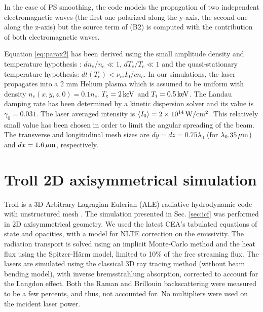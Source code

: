 \documentclass[%
 reprint,
 amsmath,amssymb,
 aps,
]{revtex4-1}
\begin{document}
In the case of PS smoothing, the code models the propagation of two independent electromagnetic waves (the first one polarized along the y-axis, the second one along the z-axis) but the source term of (B2) is computed with the contribution of both electromagnetic waves.

Equation \eqref{eq:parax2} has been derived using  the small amplitude density and temperature hypothesis : $dn_e/n_e \ll1$, $dT_e/T_e \ll 1$  and the  quasi-stationary temperature hypothesis: $dt(T_e) <\nu_{ei} I_0/cn_c$.
In our simulations, the laser propagates into a 2 mm Helium plasma which is assumed to be uniform with density $n_e(x,y,z,0) =0.1n_c$. $T_e=2\, \rm keV$ and $T_i = 0.5\, \rm keV$. The Landau damping rate has been determined by a kinetic dispersion solver and its value is $\gamma_0=0.031$. The laser averaged intensity is $\langle I_0\rangle= 2\times 10^{14}\, \rm W/cm^2$. This relatively small value has been chosen in order to limit the angular spreading of the beam. The transverse and longitudinal mesh sizes are $dy = dz = 0.75\lambda_0$ (for $\lambda_0.35\, \rm \mu m$) and $dx= 1.6 \, \rm \mu m$, respectively.


\section{Troll 2D axisymmetrical simulation}
\label{sec:troll}
\setcounter{equation}{0} 
\renewcommand{\theequation}{C\arabic{equation}}
Troll is a 3D Arbitrary Lagragian-Eulerian (ALE) radiative hydrodynamic code with unstructured mesh \cite[]{Lefebvre_2018}. The simulation presented in Sec. \ref{sec:icf} was performed in 2D axisymmetrical geometry. We used the latest CEA’s tabulated equations of state and opacities, with a model for NLTE correction on the emissivity. The radiation transport is solved using an implicit Monte-Carlo method and the heat flux using the Spitzer-Härm model, limited to 10\% of the free streaming flux. The lasers are simulated using the classical 3D ray tracing method (without beam bending model), with inverse bremsstrahlung absorption, corrected to account for the Langdon effect. Both the Raman and Brillouin backscattering were measured to be a few percents, and thus, not accounted for. No multipliers were used on the incident laser power.

%

\end{document}
